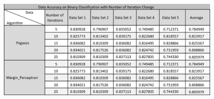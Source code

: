 \documentclass[11pt,letterpaper]{article}
\begin{document}
\begin{figure}
  \includegraphics[width=\linewidth]{data_8.png}
  \label{fig:data_8}
\end{figure}
\end{document}
